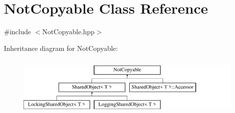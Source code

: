 \hypertarget{class_not_copyable}{}\section{Not\+Copyable Class Reference}
\label{class_not_copyable}


{\ttfamily \#include $<$Not\+Copyable.\+hpp$>$}

Inheritance diagram for Not\+Copyable\+:\begin{figure}[H]
\begin{center}
\leavevmode
\includegraphics[height=2.962963cm]{class_not_copyable}
\end{center}
\end{figure}
